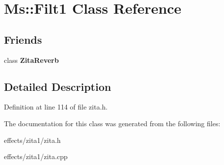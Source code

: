 \hypertarget{class_ms_1_1_filt1}{}\section{Ms\+:\+:Filt1 Class Reference}
\label{class_ms_1_1_filt1}
\subsection*{Friends}
\begin{DoxyCompactItemize}
\item 
\mbox{\label{class_ms_1_1_filt1_a174ebfd5ad2853d19b5ec49485b195f0}} 
class {\bfseries Zita\+Reverb}
\end{DoxyCompactItemize}


\subsection{Detailed Description}


Definition at line 114 of file zita.\+h.



The documentation for this class was generated from the following files\+:\begin{DoxyCompactItemize}
\item 
effects/zita1/zita.\+h\item 
effects/zita1/zita.\+cpp\end{DoxyCompactItemize}
